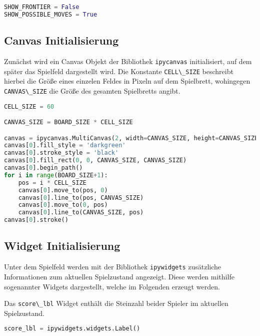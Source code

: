 \begin{lstlisting}[language=Python]
SHOW_FRONTIER = False
SHOW_POSSIBLE_MOVES = True
\end{lstlisting}

\hypertarget{canvas-initialisierung}{%
\subsection{Canvas Initialisierung}\label{canvas-initialisierung}}

Zunächst wird ein Canvas Objekt der Bibliothek
\passthrough{\lstinline!ipycanvas!} initialisiert, auf dem später das
Spielfeld dargestellt wird. Die Konstante
\passthrough{\lstinline!CELL\_SIZE!} beschreibt hierbei die Größe eines
einzelen Feldes in Pixeln auf dem Spielbrett, wohingegen
\passthrough{\lstinline!CANVAS\_SIZE!} die Größe des gesamten
Spielbretts angibt.

\begin{lstlisting}[language=Python]
CELL_SIZE = 60

CANVAS_SIZE = BOARD_SIZE * CELL_SIZE

canvas = ipycanvas.MultiCanvas(2, width=CANVAS_SIZE, height=CANVAS_SIZE)
canvas[0].fill_style = 'darkgreen'
canvas[0].stroke_style = 'black'
canvas[0].fill_rect(0, 0, CANVAS_SIZE, CANVAS_SIZE)
canvas[0].begin_path()
for i in range(BOARD_SIZE+1):
    pos = i * CELL_SIZE
    canvas[0].move_to(pos, 0)
    canvas[0].line_to(pos, CANVAS_SIZE)
    canvas[0].move_to(0, pos)
    canvas[0].line_to(CANVAS_SIZE, pos)
canvas[0].stroke()
\end{lstlisting}

\hypertarget{widget-initialisierung}{%
\subsection{Widget Initialisierung}\label{widget-initialisierung}}

Unter dem Spielfeld werden mit der Bibliothek
\passthrough{\lstinline!ipywidgets!} zusätzliche Informationen zum
aktuellen Spielzustand angezeigt. Diese werden mithilfe sogenannter
Widgets dargestellt, welche im Folgenden erzeugt werden.

Das \passthrough{\lstinline!score\_lbl!} Widget enthält die Steinzahl
beider Spieler im aktuellen Spielzustand.

\begin{lstlisting}[language=Python]
score_lbl = ipywidgets.widgets.Label()
\end{lstlisting}

